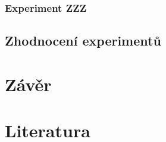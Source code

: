 \documentclass[a4paper,11pt]{article}
\begin{document}
\subsubsection{Experiment ZZZ}
\subsection{Zhodnocení experimentů}

\section{Závěr}


\section{Literatura}


\newpage

\renewcommand{\refname}{\section{Literatura}}

\end{document}

